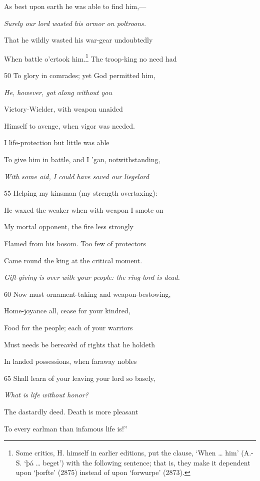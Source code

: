 As best upon earth he was able to find him,—

\emph{Surely our lord
wasted his armor
on poltroons.}

That he wildly wasted his war-gear undoubtedly

When battle o’ertook him.\footnote{Some critics, H. himself in earlier editions, put the clause, ‘When …
him’ (A.-S. ‘þá … beget’) with the following sentence; that is, they make it
dependent upon ‘þorfte’ (2875) instead of upon ‘forwurpe’ (2873).} The troop-king no need had

50
To glory in comrades; yet God permitted him,

\emph{He, however, got
along without you}

Victory-Wielder, with weapon unaided

Himself to avenge, when vigor was needed.

I life-protection but little was able

To give him in battle, and I ’gan, notwithstanding,

\emph{With some aid, I
could have saved
our liegelord}

55
Helping my kinsman (my strength overtaxing):

He waxed the weaker when with weapon I smote on

My mortal opponent, the fire less strongly

Flamed from his bosom. Too few of protectors

Came round the king at the critical moment.

\emph{Gift-giving is over
with your people:
the ring-lord is
dead.}

60
Now must ornament-taking and weapon-bestowing,

Home-joyance all, cease for your kindred,

Food for the people; each of your warriors

Must needs be bereavèd of rights that he holdeth

In landed possessions, when faraway nobles

65
Shall learn of your leaving your lord so basely,

\emph{What is life without
honor?}

The dastardly deed. Death is more pleasant

To every earlman than infamous life is!”



